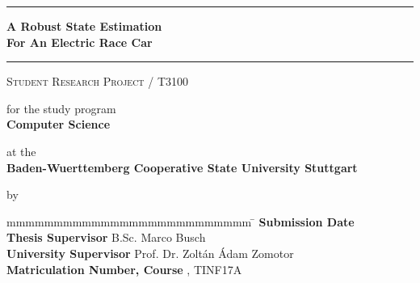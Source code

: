 \hfill
{}

\vfill
\begin{center}
	\rule{\textwidth}{1pt}
	{
		\Huge
		\bfseries
		A Robust State Estimation \\ For An Electric Race Car
		\par
	}
	\vspace{-0.2cm} 
	\rule{\textwidth}{1pt}

	\vfill

	\textsc{Student Research Project / T3100}
	
	\vfill

	for the study program \\ \textbf{Computer Science}
	
	at the \\ \textbf{Baden-Wuerttemberg Cooperative State University Stuttgart}
	
	by \\ \textbf{\@author}
\end{center}

\vfill

\begin{tabbing}
	mmmmmmmmmmmmmmmmmmmmmmmmmm				\= \kill
	\textbf{Submission Date}				\> \@date \\
	\textbf{Thesis Supervisor}           	\> B.Sc. Marco Busch \\
	\textbf{University Supervisor}          \> Prof. Dr. Zoltán Ádam Zomotor \\
	\textbf{Matriculation Number, Course}  	, TINF17A
\end{tabbing}
